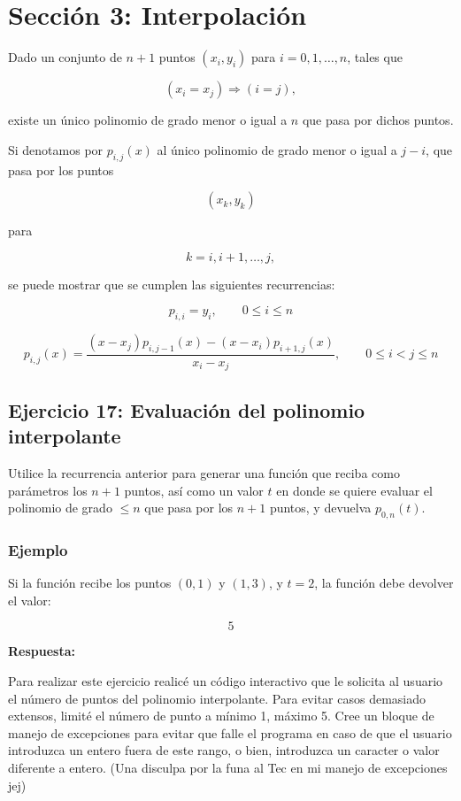 \documentclass[12pt]{article}
\newcommand{\respuesta}{
    \vspace{0.3cm}
    \noindent\textbf{Respuesta:}
    \vspace{0.2cm}
}
\begin{document}
\section*{Sección 3: Interpolación}

Dado un conjunto de $n + 1$ puntos $(x_i, y_i)$ para $i = 0, 1, \dots, n$, tales que

\[
(x_i = x_j) \Rightarrow (i = j),
\]

existe un único polinomio de grado menor o igual a $n$ que pasa por dichos puntos.

Si denotamos por $p_{i,j}(x)$ al único polinomio de grado menor o igual a $j-i$, que pasa por los puntos

\[
(x_k, y_k)
\]

para

\[
k = i, i+1, \dots, j,
\]

se puede mostrar que se cumplen las siguientes recurrencias:

\[
p_{i,i} = y_i, \qquad 0 \leq i \leq n
\]

\[
p_{i,j}(x) =
\frac{
(x - x_j)p_{i,j-1}(x) - (x - x_i)p_{i+1,j}(x)
}{
x_i - x_j
},
\qquad 0 \leq i < j \leq n
\]

\subsection*{Ejercicio 17: Evaluación del polinomio interpolante}

Utilice la recurrencia anterior para generar una función que reciba como parámetros los $n + 1$ puntos, así como un valor $t$ en donde se quiere evaluar el polinomio de grado $\leq n$ que pasa por los $n + 1$ puntos, y devuelva $p_{0,n}(t)$.

\subsubsection*{Ejemplo}

Si la función recibe los puntos $(0,1)$ y $(1,3)$, y $t = 2$, la función debe devolver el valor:

\[
5
\]

\respuesta
Para realizar este ejercicio realicé un código interactivo que le solicita al usuario el número de puntos del polinomio interpolante. Para evitar casos demasiado extensos, limité el número de punto a mínimo 1, máximo 5. Cree un bloque de manejo de excepciones para evitar que falle el programa en caso de que el usuario introduzca un entero fuera de este rango, o bien, introduzca un caracter o valor diferente a entero. (Una disculpa por la funa al Tec en mi manejo de excepciones jej)
\end{document}
